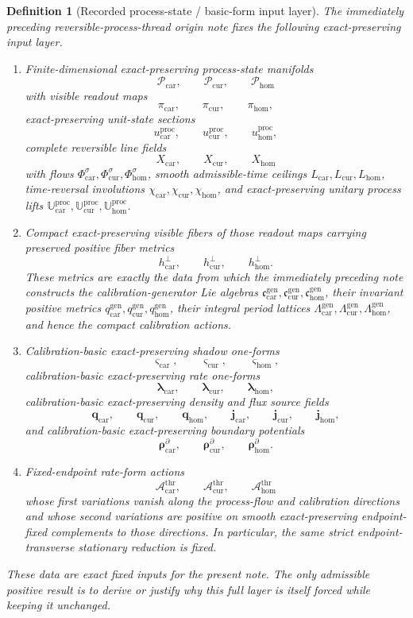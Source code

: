 \documentclass[11pt]{article}
\newcommand{\TensorCalLie}{\mathfrak c_{\mathrm{car}}^{\mathrm{gen}}}
\newcommand{\CurCalLie}{\mathfrak c_{\mathrm{cur}}^{\mathrm{gen}}}
\newcommand{\HomCalLie}{\mathfrak c_{\mathrm{hom}}^{\mathrm{gen}}}
\newcommand{\TensorCalMetric}{q_{\mathrm{car}}^{\mathrm{gen}}}
\newcommand{\CurCalMetric}{q_{\mathrm{cur}}^{\mathrm{gen}}}
\newcommand{\HomCalMetric}{q_{\mathrm{hom}}^{\mathrm{gen}}}
\newcommand{\TensorCalLat}{\Lambda_{\mathrm{car}}^{\mathrm{gen}}}
\newcommand{\CurCalLat}{\Lambda_{\mathrm{cur}}^{\mathrm{gen}}}
\newcommand{\HomCalLat}{\Lambda_{\mathrm{hom}}^{\mathrm{gen}}}
\newcommand{\TensorProcSpace}{\mathcal P_{\mathrm{car}}}
\newcommand{\CurProcSpace}{\mathcal P_{\mathrm{cur}}}
\newcommand{\HomProcSpace}{\mathcal P_{\mathrm{hom}}}
\newcommand{\TensorProcRead}{\pi_{\mathrm{car}}}
\newcommand{\CurProcRead}{\pi_{\mathrm{cur}}}
\newcommand{\HomProcRead}{\pi_{\mathrm{hom}}}
\newcommand{\TensorProcUnit}{u_{\mathrm{car}}^{\mathrm{proc}}}
\newcommand{\CurProcUnit}{u_{\mathrm{cur}}^{\mathrm{proc}}}
\newcommand{\HomProcUnit}{u_{\mathrm{hom}}^{\mathrm{proc}}}
\newcommand{\TensorFlowField}{X_{\mathrm{car}}}
\newcommand{\CurFlowField}{X_{\mathrm{cur}}}
\newcommand{\HomFlowField}{X_{\mathrm{hom}}}
\newcommand{\TensorOrbitFlow}{\Phi_{\mathrm{car}}}
\newcommand{\CurOrbitFlow}{\Phi_{\mathrm{cur}}}
\newcommand{\HomOrbitFlow}{\Phi_{\mathrm{hom}}}
\newcommand{\TensorProcLength}{L_{\mathrm{car}}}
\newcommand{\CurProcLength}{L_{\mathrm{cur}}}
\newcommand{\HomProcLength}{L_{\mathrm{hom}}}
\newcommand{\TensorProcTimeRev}{\chi_{\mathrm{car}}}
\newcommand{\CurProcTimeRev}{\chi_{\mathrm{cur}}}
\newcommand{\HomProcTimeRev}{\chi_{\mathrm{hom}}}
\newcommand{\TensorProcMetric}{h_{\mathrm{car}}^{\perp}}
\newcommand{\CurProcMetric}{h_{\mathrm{cur}}^{\perp}}
\newcommand{\HomProcMetric}{h_{\mathrm{hom}}^{\perp}}
\newcommand{\TensorProcLift}{\mathbb U_{\mathrm{car}}^{\mathrm{proc}}}
\newcommand{\CurProcLift}{\mathbb U_{\mathrm{cur}}^{\mathrm{proc}}}
\newcommand{\HomProcLift}{\mathbb U_{\mathrm{hom}}^{\mathrm{proc}}}
\newcommand{\TensorShadowForm}{\boldsymbol{\varsigma}_{\mathrm{car}}}
\newcommand{\CurShadowForm}{\boldsymbol{\varsigma}_{\mathrm{cur}}}
\newcommand{\HomShadowForm}{\boldsymbol{\varsigma}_{\mathrm{hom}}}
\newcommand{\TensorRateForm}{\boldsymbol{\lambda}_{\mathrm{car}}}
\newcommand{\CurRateForm}{\boldsymbol{\lambda}_{\mathrm{cur}}}
\newcommand{\HomRateForm}{\boldsymbol{\lambda}_{\mathrm{hom}}}
\newcommand{\TensorDensitySource}{\boldsymbol{q}_{\mathrm{car}}}
\newcommand{\CurDensitySource}{\boldsymbol{q}_{\mathrm{cur}}}
\newcommand{\HomDensitySource}{\boldsymbol{q}_{\mathrm{hom}}}
\newcommand{\TensorFluxSource}{\boldsymbol{j}_{\mathrm{car}}}
\newcommand{\CurFluxSource}{\boldsymbol{j}_{\mathrm{cur}}}
\newcommand{\HomFluxSource}{\boldsymbol{j}_{\mathrm{hom}}}
\newcommand{\TensorBoundarySource}{\boldsymbol{\rho}_{\mathrm{car}}^{\partial}}
\newcommand{\CurBoundarySource}{\boldsymbol{\rho}_{\mathrm{cur}}^{\partial}}
\newcommand{\HomBoundarySource}{\boldsymbol{\rho}_{\mathrm{hom}}^{\partial}}
\newcommand{\TensorThreadAction}{\mathscr A_{\mathrm{car}}^{\mathrm{thr}}}
\newcommand{\CurThreadAction}{\mathscr A_{\mathrm{cur}}^{\mathrm{thr}}}
\newcommand{\HomThreadAction}{\mathscr A_{\mathrm{hom}}^{\mathrm{thr}}}
\newtheorem{definition}{Definition}
\begin{document}
\begin{definition}[Recorded process-state / basic-form input layer]
\label{def:recorded_layer}
The immediately preceding reversible-process-thread origin note fixes the following exact-preserving input layer.
\begin{enumerate}
    \item Finite-dimensional exact-preserving process-state manifolds
    \[
    \TensorProcSpace,\qquad
    \CurProcSpace,\qquad
    \HomProcSpace
    \]
    with visible readout maps
    \[
    \TensorProcRead,\qquad
    \CurProcRead,\qquad
    \HomProcRead,
    \]
    exact-preserving unit-state sections
    \[
    \TensorProcUnit,\qquad
    \CurProcUnit,\qquad
    \HomProcUnit,
    \]
    complete reversible line fields
    \[
    \TensorFlowField,\qquad
    \CurFlowField,\qquad
    \HomFlowField
    \]
    with flows \(\TensorOrbitFlow^\sigma,\CurOrbitFlow^\sigma,\HomOrbitFlow^\sigma\), smooth admissible-time ceilings \(\TensorProcLength,\CurProcLength,\HomProcLength\), time-reversal involutions \(\TensorProcTimeRev,\CurProcTimeRev,\HomProcTimeRev\), and exact-preserving unitary process lifts \(\TensorProcLift,\CurProcLift,\HomProcLift\).
    \item Compact exact-preserving visible fibers of those readout maps carrying preserved positive fiber metrics
    \[
    \TensorProcMetric,\qquad
    \CurProcMetric,\qquad
    \HomProcMetric.
    \]
    These metrics are exactly the data from which the immediately preceding note constructs the calibration-generator Lie algebras \(\TensorCalLie,\CurCalLie,\HomCalLie\), their invariant positive metrics \(\TensorCalMetric,\CurCalMetric,\HomCalMetric\), their integral period lattices \(\TensorCalLat,\CurCalLat,\HomCalLat\), and hence the compact calibration actions.
    \item Calibration-basic exact-preserving shadow one-forms
    \[
    \TensorShadowForm,\qquad
    \CurShadowForm,\qquad
    \HomShadowForm,
    \]
    calibration-basic exact-preserving rate one-forms
    \[
    \TensorRateForm,\qquad
    \CurRateForm,\qquad
    \HomRateForm,
    \]
    calibration-basic exact-preserving density and flux source fields
    \[
    \TensorDensitySource,\qquad
    \CurDensitySource,\qquad
    \HomDensitySource,\qquad
    \TensorFluxSource,\qquad
    \CurFluxSource,\qquad
    \HomFluxSource,
    \]
    and calibration-basic exact-preserving boundary potentials
    \[
    \TensorBoundarySource,\qquad
    \CurBoundarySource,\qquad
    \HomBoundarySource.
    \]
    \item Fixed-endpoint rate-form actions
    \[
    \TensorThreadAction,\qquad
    \CurThreadAction,\qquad
    \HomThreadAction
    \]
    whose first variations vanish along the process-flow and calibration directions and whose second variations are positive on smooth exact-preserving endpoint-fixed complements to those directions. In particular, the same strict endpoint-transverse stationary reduction is fixed.
\end{enumerate}
These data are exact fixed inputs for the present note. The only admissible positive result is to derive or justify why this full layer is itself forced while keeping it unchanged.
\end{definition}
\end{document}
